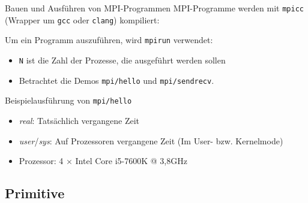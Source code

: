 \documentclass{beamer}
\begin{document}
\begin{frame}{Bauen und Ausführen von MPI-Programmen}
        MPI-Programme werden mit \texttt{mpicc} (Wrapper um \texttt{gcc} oder \texttt{clang}) kompiliert:


	Um ein Programm auszuführen, wird \texttt{mpirun} verwendet:


	\begin{itemize}
		\item \texttt{N} ist die Zahl der Prozesse, die ausgeführt werden sollen
                \item Betrachtet die Demos \texttt{mpi/hello} und \texttt{mpi/sendrecv}.
	\end{itemize}
\end{frame}

\begin{frame}{Beispielausführung von \texttt{mpi/hello}}
  \begin{figure}
    
  \end{figure}

  \begin{itemize}
    \item \emph{real}: Tatsächlich vergangene Zeit
    \item \emph{user}/\emph{sys}: Auf Prozessoren vergangene Zeit {\tiny (Im User- bzw. Kernelmode)}
	\pause
    \item Prozessor: 4 $\times$ Intel Core i5-7600K @ 3,8GHz
  \end{itemize}
\end{frame}

\subsection{Primitive}

\end{document}
